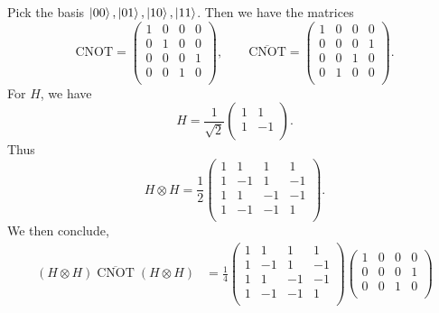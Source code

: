 \begin{solution}
    Pick the basis $\ket{00},\ket{01},\ket{10},\ket{11}$. Then we have the matrices
    \[
        \text{CNOT} =
        \begin{pmatrix}
            1 & 0 & 0 & 0 \\
            0 & 1 & 0 & 0 \\
            0 & 0 & 0 & 1 \\
            0 & 0 & 1 & 0 \\
        \end{pmatrix},
        \qquad
        \overline{\text{CNOT}} =
        \begin{pmatrix}
            1 & 0 & 0 & 0 \\
            0 & 0 & 0 & 1 \\
            0 & 0 & 1 & 0 \\
            0 & 1 & 0 & 0 \\
        \end{pmatrix}.
    \]
    For $H$, we have
    \[
        H = \frac{1}{\sqrt 2}
        \begin{pmatrix}
            1 & 1  \\
            1 & -1 \\
        \end{pmatrix}.
    \]
    Thus
    \[
        H \otimes H = \frac{1}{2}
        \begin{pmatrix}
            1 & 1 & 1 & 1 \\
            1 & -1 & 1 & -1 \\
            1 & 1 & -1 & -1 \\
            1 & -1 & -1 & 1 \\
        \end{pmatrix}.
    \]
    We then conclude,
    \begin{align*}
        (H \otimes H) \; \overline{\text{CNOT}} \; (H \otimes H)
        &= \frac14
        \begin{pmatrix}
            1 & 1 & 1 & 1 \\
            1 & -1 & 1 & -1 \\
            1 & 1 & -1 & -1 \\
            1 & -1 & -1 & 1 \\
        \end{pmatrix}
        \begin{pmatrix}
            1 & 0 & 0 & 0 \\
            0 & 0 & 0 & 1 \\
            0 & 0 & 1 & 0 \\

\end{pmatrix}
\end{align*}
\end{solution}
